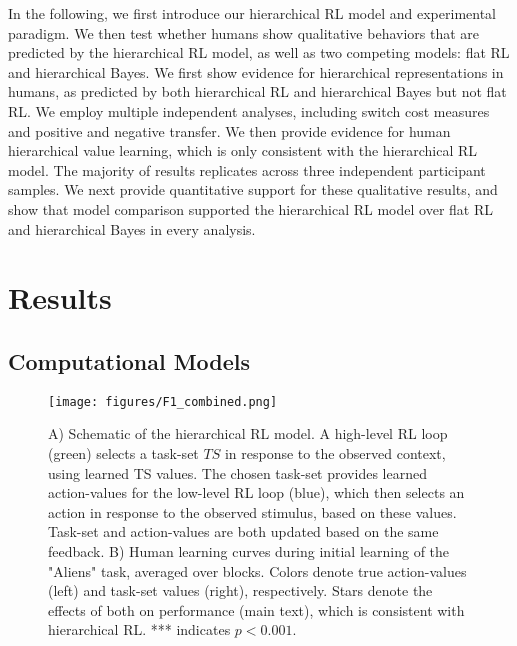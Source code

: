 \documentclass[10pt,letterpaper]{article}  %
\newcommand{\rev}{\color{black}}
\begin{document}
{\rev In the following, we first introduce our hierarchical RL model and experimental paradigm. We then test whether humans show qualitative behaviors that are predicted by the hierarchical RL model, as well as two competing models: flat RL and hierarchical Bayes.
We first show evidence for hierarchical representations in humans, as predicted by both hierarchical RL and hierarchical Bayes but not flat RL. We employ multiple independent analyses, including switch cost measures and positive and negative transfer.
We then provide evidence for human hierarchical value learning, which is only consistent with the hierarchical RL model.
The majority of results replicates across three independent participant samples.
We next provide quantitative support for these qualitative results, and show that model comparison supported the hierarchical RL model over flat RL and hierarchical Bayes in every analysis.}

\section*{Results}
\subsection*{Computational Models}
 
\begin{figure}%
    \begin{center}
	\texttt{[image: figures/F1\_combined.png]}
    \end{center}
    \caption{A) Schematic of the hierarchical RL model. A high-level RL loop (green) selects a task-set $TS$ in response to the observed context, using learned TS values. The chosen task-set provides learned action-values for the low-level RL loop (blue), which then selects an action in response to the observed stimulus, based on these values. Task-set and action-values are both updated based on the same feedback. B) Human learning curves during initial learning of the "Aliens" task, averaged over blocks. Colors denote true action-values (left) and task-set values (right), respectively. Stars denote the effects of both on performance (main text), which is consistent with hierarchical RL. *** indicates $p<0.001$.}
    \label{figure:F1_combined}
\end{figure}
\end{document}
